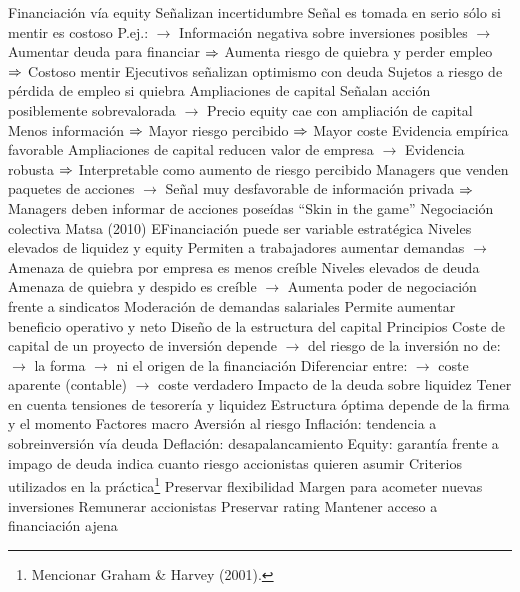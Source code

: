 \documentclass{nuevotema}
\begin{document}
\begin{esquemal}
				\4 Financiación vía equity
				\4[] Señalizan incertidumbre
				\4 Señal es tomada en serio sólo si mentir es costoso
				\4[] P.ej.:
				\4[] $\to$ Información negativa sobre inversiones posibles
				\4[] $\to$ Aumentar deuda para financiar
				\4[] $\Rightarrow$ Aumenta riesgo de quiebra y perder empleo
				\4[] $\Rightarrow$ Costoso mentir
				\4 Ejecutivos señalizan optimismo con deuda
				\4[] Sujetos a riesgo de pérdida de empleo si quiebra
				\4 Ampliaciones de capital
				\4[] Señalan acción posiblemente sobrevalorada
				\4[] $\to$ Precio equity cae con ampliación de capital
				\4 Menos información
				\4[] $\Rightarrow$ Mayor riesgo percibido
				\4[] $\Rightarrow$ Mayor coste
				\4 Evidencia empírica favorable
				\4[] Ampliaciones de capital reducen valor de empresa
				\4[] $\to$ Evidencia robusta
				\4[] $\Rightarrow$ Interpretable como aumento de riesgo percibido
				\4[] Managers que venden paquetes de acciones
				\4[] $\to$ Señal muy desfavorable de información privada
				\4[] $\Rightarrow$ Managers deben informar de acciones poseídas
				\4 ``Skin in the game''
			\3 Negociación colectiva
				\4 Matsa (2010)
				\4 EFinanciación puede ser variable estratégica
				\4 Niveles elevados de liquidez y equity
				\4[] Permiten a trabajadores aumentar demandas
				\4[] $\to$ Amenaza de quiebra por empresa es menos creíble
				\4 Niveles elevados de deuda
				\4[] Amenaza de quiebra y despido es creíble
				\4[] $\to$ Aumenta poder de negociación frente a sindicatos
				\4 Moderación de demandas salariales
				\4[] Permite aumentar beneficio operativo y neto
		\2 Diseño de la estructura del capital
			\3 Principios
				\4 Coste de capital de un proyecto de inversión depende
				\4[] $\to$ del riesgo de la inversión
				\4[] no de:
				\4[] $\to$ la forma
				\4[] $\to$ ni el origen de la financiación
				\4 Diferenciar entre:
				\4[] $\to$ coste aparente (contable)
				\4[] $\to$ coste verdadero
				\4 Impacto de la deuda sobre liquidez
				\4[] Tener en cuenta tensiones de tesorería y liquidez
			\3 Estructura óptima depende de la firma y el momento
				\4 Factores macro
				\4 Aversión al riesgo
				\4 Inflación:
				\4[] tendencia a sobreinversión vía deuda
				\4 Deflación:
				\4[] desapalancamiento
				\4 Equity:
				\4[] garantía frente a impago de deuda
				\4[] indica cuanto riesgo accionistas quieren asumir
			\3 Criterios utilizados en la práctica\footnote{Mencionar Graham \& Harvey (2001).}
				\4 Preservar flexibilidad
				\4[] Margen para acometer nuevas inversiones
				\4[] Remunerar accionistas
				\4 Preservar rating
				\4[] Mantener acceso a financiación ajena

\end{esquemal}
\end{document}
